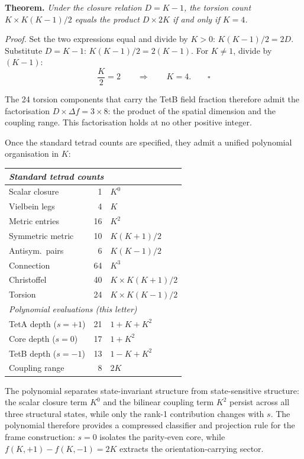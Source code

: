 \documentclass[twocolumn]{iopjournal}
\begin{document}
\medskip
\noindent\textbf{Theorem.} \textit{Under the closure relation
$D = K - 1$, the torsion count
$K \times K(K{-}1)/2$ equals the product $D \times 2K$ if and
only if $K = 4$.}

\medskip\noindent\textit{Proof.}
Set the two expressions equal and divide by $K > 0$:
$K(K{-}1)/2 = 2D$. Substitute $D = K - 1$:
$K(K{-}1)/2 = 2(K{-}1)$. For $K \neq 1$, divide by $(K{-}1)$:
\begin{equation}
  \frac{K}{2} = 2 \qquad \Longrightarrow \qquad K = 4.
  \qquad\square
  \label{eq:thm}
\end{equation}

The 24 torsion components that carry the TetB field fraction
therefore admit the factorisation $D \times \Delta f = 3 \times
8$: the product of the spatial dimension and the coupling range.
This factorisation holds at no other positive integer.

Once the standard tetrad counts are specified, they admit a
unified polynomial organisation in $K$:

\medskip
\begin{center}
\begin{tabular}{lrl}
\hline
\multicolumn{3}{l}{\textit{Standard tetrad counts}} \\
\hline
Scalar closure    & 1  & $K^0$ \\
Vielbein legs     & 4  & $K$ \\
Metric entries    & 16 & $K^2$ \\
Symmetric metric  & 10 & $K(K{+}1)/2$ \\
Antisym.\ pairs   & 6  & $K(K{-}1)/2$ \\
Connection        & 64 & $K^3$ \\
Christoffel       & 40 & $K \!\times\! K(K{+}1)/2$ \\
Torsion           & 24 & $K \!\times\! K(K{-}1)/2$ \\
\hline
\multicolumn{3}{l}{\textit{Polynomial evaluations (this letter)}} \\
\hline
TetA depth ($s{=}{+}1$) & 21 & $1 + K + K^2$ \\
Core depth ($s{=}0$)     & 17 & $1 + K^2$ \\
TetB depth ($s{=}{-}1$)  & 13 & $1 - K + K^2$ \\
Coupling range           & 8  & $2K$ \\
\hline
\end{tabular}
\end{center}
\medskip

\noindent
The polynomial separates state-invariant structure from
state-sensitive structure: the scalar closure term $K^0$ and the
bilinear coupling term $K^2$ persist across all three structural
states, while only the rank-1 contribution changes with $s$. The
polynomial therefore provides a compressed classifier and
projection rule for the frame construction: $s = 0$ isolates the
parity-even core, while $f(K,{+}1) - f(K,{-}1) = 2K$ extracts
the orientation-carrying sector.
\end{document}
